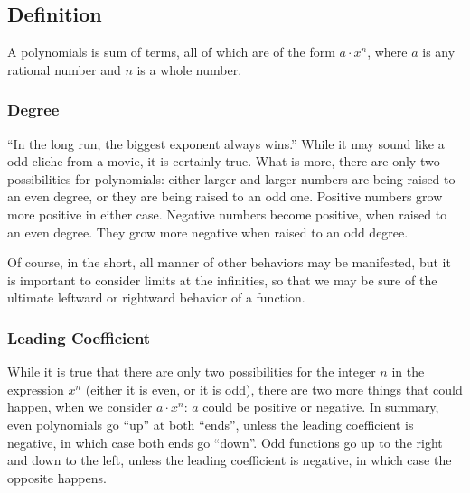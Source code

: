 
\subsection{Definition}



A polynomials is sum of terms, all of which are of the form $a\cdot{}x^n$, where $a$
is any rational number and $n$ is a whole number.

\subsubsection{Degree}
``In the long run, the biggest exponent always wins.''  While it may sound like a odd
cliche from a movie, it is certainly true.  What is more, there are only two possibilities
for polynomials: either larger and larger numbers are being raised to an even degree,
or they are being raised to an odd one.  Positive numbers grow more positive in either case.
Negative numbers become positive, when raised to an even degree.  They grow more
negative when raised to an odd degree.

Of course, in the short, all manner of other behaviors may be manifested, but it is 
important to consider limits at the infinities, so that we may be sure of the ultimate
leftward or rightward behavior of a function.


\subsubsection{Leading Coefficient}
While it is true that there are only two possibilities for the integer $n$ in the 
expression $x^n$ (either it is even, or it is odd), there are two more things that could 
happen, when we consider $a\cdot{}x^n$: $a$ could be positive or negative.
In summary, even polynomials go ``up'' at both ``ends'', unless the leading coefficient
is negative, in which case both ends go ``down''.  Odd functions go up to the right and
down to the left, unless the leading coefficient is negative, in which case the opposite
happens.

